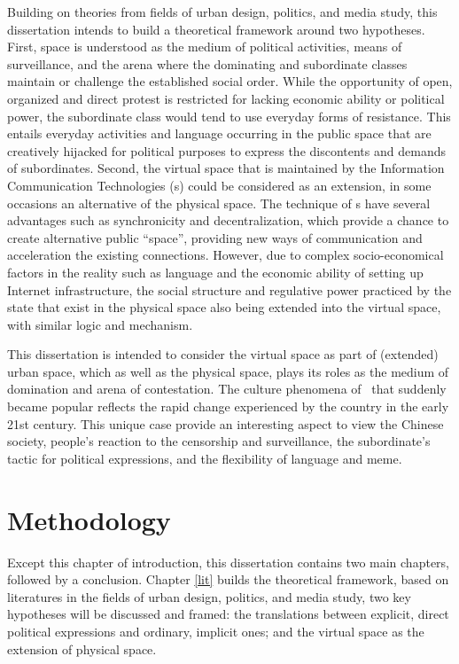 Building on theories from fields of urban design, politics, and media study, this dissertation intends to build a theoretical framework around two hypotheses. First, space is understood as the medium of political activities, means of surveillance, and the arena where the dominating and subordinate classes maintain or challenge the established social order. While the opportunity of open, organized and direct protest is restricted for lacking economic ability or political power, the subordinate class would tend to use everyday forms of resistance. This entails everyday activities and language occurring in the public space that are creatively hijacked for political purposes to express the discontents and demands of subordinates. Second, the virtual space that is maintained by the Information Communication Technologies (\ict s) could be considered as an extension, in some occasions an alternative of the physical space. The technique of \ict s have several advantages such as synchronicity and decentralization, which provide a chance to create alternative public ``space'', providing new ways of communication and acceleration the existing connections. However, due to complex socio-economical factors in the reality such as language and the economic ability of setting up Internet infrastructure, the social structure and regulative power practiced by the state that exist in the physical space also being extended into the virtual space, with similar logic and mechanism.

This dissertation is intended to consider the virtual space as part of (extended) urban space, which as well as the physical space, plays its roles as the medium of domination and arena of contestation. The culture phenomena of \moha\ that suddenly became popular reflects the rapid change experienced by the country in the early 21st century. This unique case provide an interesting aspect to view the Chinese society, people's reaction to the censorship and surveillance, the subordinate's tactic for political expressions, and the flexibility of language and meme.

\section{Methodology}

Except this chapter of introduction, this dissertation contains two main chapters, followed by a conclusion. Chapter \ref{lit} builds the theoretical framework, based on literatures in the fields of urban design, politics, and media study, two key hypotheses will be discussed and framed: the translations between explicit, direct political expressions and ordinary, implicit ones; and the virtual space as the extension of physical space.

